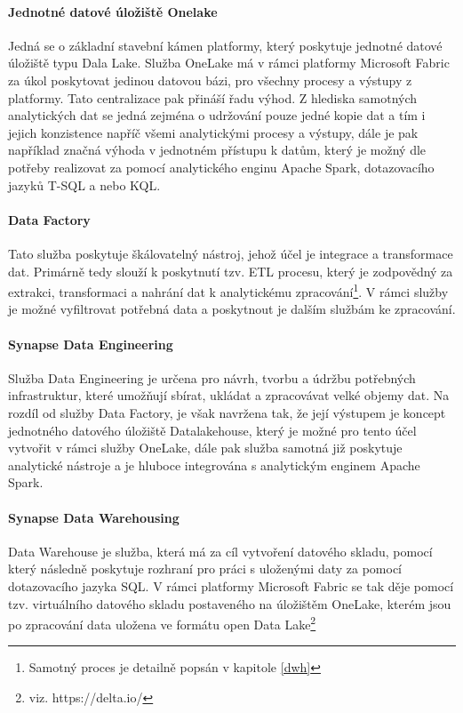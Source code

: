 \documentclass[
  digital,     %
  twoside,     %
  lof,         %
  lot,         %
]{fithesis4}
\begin{document}
\paragraph{Jednotné datové úložiště Onelake}
Jedná se o základní stavební kámen platformy, který poskytuje jednotné datové úložiště typu Dala Lake. Služba OneLake má v rámci platformy Microsoft Fabric za úkol poskytovat jedinou datovou bázi, pro všechny procesy a výstupy z platformy. Tato centralizace pak přináší řadu výhod. Z hlediska samotných analytických dat se jedná zejména o udržování pouze jedné kopie dat a tím i jejich konzistence napříč všemi analytickými procesy a výstupy, dále je pak například značná výhoda v jednotném přístupu k datům, který je možný dle potřeby realizovat za pomocí analytického enginu Apache Spark, dotazovacího jazyků T-SQL a nebo KQL.\parencite{OneLake}

\paragraph{Data Factory}
Tato služba poskytuje škálovatelný nástroj, jehož účel je integrace a transformace dat. Primárně tedy slouží k poskytnutí tzv. ETL procesu, který je zodpovědný za extrakci, transformaci a nahrání dat k analytickému zpracování\footnote{Samotný proces je detailně  popsán v kapitole \ref{dwh}}. V rámci služby je možné vyfiltrovat potřebná data a poskytnout je dalším službám ke zpracování.\parencite{DataFactory}

\paragraph{Synapse Data Engineering}
Služba Data Engineering je určena pro návrh, tvorbu a údržbu potřebných infrastruktur, které umožňují sbírat, ukládat a zpracovávat velké objemy dat. Na rozdíl od služby Data Factory, je však navržena tak, že její výstupem je koncept jednotného datového úložiště Datalakehouse, který je možné pro tento účel vytvořit v rámci služby OneLake, dále pak služba samotná již poskytuje analytické nástroje a je hluboce integrována s analytickým enginem Apache Spark.\parencite{DataEngineering}

\paragraph{Synapse Data Warehousing}
Data Warehouse je služba, která má za cíl vytvoření datového skladu, pomocí který následně poskytuje rozhraní pro práci s uloženými daty za pomocí dotazovacího jazyka SQL. V rámci platformy Microsoft Fabric se tak děje pomocí tzv. virtuálního datového skladu postaveného na úložištěm OneLake, kterém jsou po zpracování data uložena ve formátu open Data Lake\footnote{viz. https://delta.io/} \parencite{DataWarehousing}
\end{document}
